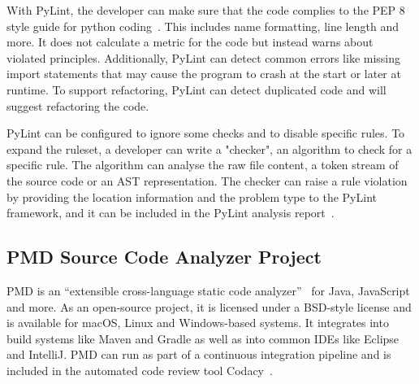 With PyLint, the developer can make sure that the code complies to the PEP 8 style guide for python coding~\cite{pep8}. This includes name formatting, line length and more. It does not calculate a metric for the code but instead warns about violated principles. Additionally, PyLint can detect common errors like missing import statements that may cause the program to crash at the start or later at runtime. To support refactoring, PyLint can detect duplicated code and will suggest refactoring the code.

PyLint can be configured to ignore some checks and to disable specific rules. To expand the ruleset, a developer can write a "checker", an algorithm to check for a specific rule. The algorithm can analyse the raw file content, a token stream of the source code or an AST representation. The checker can raise a rule violation by providing the location information and the problem type to the PyLint framework, and it can be included in the PyLint analysis report~\cite{noauthor_how_nodate}.

\subsection{PMD Source Code Analyzer Project}
PMD is an \enquote{extensible cross-language static code analyzer}~\cite{noauthor_pmd_nodate} for Java, JavaScript and more. As an open-source project, it is licensed under a BSD-style license and is available for macOS, Linux and Windows-based systems. It integrates into build systems like Maven and Gradle as well as into common IDEs like Eclipse and IntelliJ. PMD can run as part of a continuous integration pipeline and is included in the automated code review tool Codacy~\cite{noauthor_codacy_nodate-1}.

